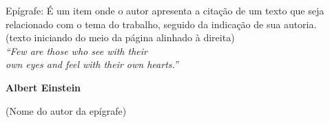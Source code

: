 
\begin{epigrafe}
  \vspace*{\fill}
  \begin{flushright}
    Epígrafe: É um item onde o autor apresenta a citação de um texto que seja relacionado com o tema do trabalho, seguido da indicação de sua autoria.\\
    (texto iniciando do meio da página alinhado à direita)\\

    \vspace{\onelineskip}
    \textit{``Few are those who see with their \\
    own eyes and feel with their own hearts.''\\}
    \vspace{\onelineskip}

    \textbf{Albert Einstein} \par
    (Nome do autor da epígrafe)
  \end{flushright}
\end{epigrafe}
